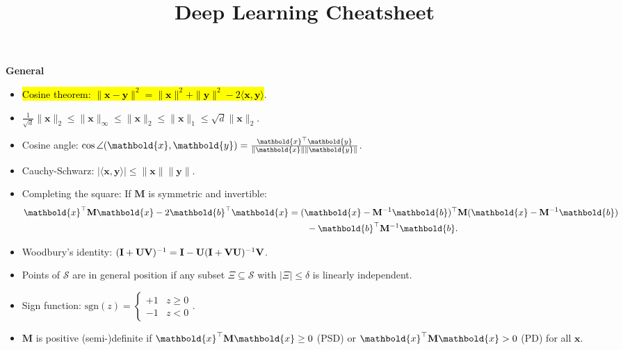 \documentclass[10pt]{article}
\title{Deep Learning Cheatsheet}
\newenvironment{subtopic}[1]
{\begin{center}\textbf{\footnotesize \sffamily #1}\end{center}}
{}
\renewcommand{\mat}[1]{\ensuremath{\mathbf{#1}}}
\renewcommand{\vec}[1]{\ensuremath{\mathbold{#1}}}
\begin{document}
\setlength{\columnsep}{0.2cm}

\begin{multicols*}{3}

    \scriptsize

    \begin{subtopic}{General}
        \begin{itemize}[left=0pt]
            \item \hl{Cosine theorem: $\| \vec{x}-\vec{y} \|^2 = \| \vec{x} \|^2 + \| \vec{y} \|^2 - 2\langle \vec{x},\vec{y} \rangle$}.
            \item $\frac{1}{\sqrt{d}} \| \vec{x} \|_2 \leq \| \vec{x} \|_{\infty} \leq \| \vec{x} \|_2 \leq \| \vec{x} \|_1 \leq \sqrt{d} \| \vec{x} \|_2$.
            \item Cosine angle: $\cos \angle{(\vec{x},\vec{y})} = \frac{\transpose{\vec{x}} \vec{y}}{\| \vec{x} \| \|
                        \vec{y} \|}$.
            \item Cauchy-Schwarz: $|\langle \vec{x}, \vec{y} \rangle| \leq \| \vec{x} \| \| \vec{y} \|$.
            \item Completing the square: If $\mat{M}$ is symmetric and invertible:
                \begin{align*}
                    \transpose{\vec{x}} \mat{M} \vec{x} - 2 \transpose{\vec{b}} \vec{x} & = \transpose{(\vec{x} - \inv{\mat{M}} \vec{b})} \mat{M} (\vec{x} - \inv{\mat{M}} \vec{b}) \\
                                                                                        & \quad \quad - \transpose{\vec{b}} \inv{\mat{M}} \vec{b}.
                \end{align*}
            \item Woodbury's identity: $\inv{(\mat{I} + \mat{U} \mat{V})} = \mat{I} - \mat{U} \inv{(\mat{I} + \mat{V} \mat{U})} \mat{V}$.
            \item Points of $\mathcal{S}$ are in general position if any subset $\Xi \subseteq \mathcal{S}$ with
                $|\Xi| \leq \delta$ is linearly independent.
            \item Sign function: $\mathrm{sgn}(z) = \begin{cases} +1 & z \geq 0 \\ -1 & z < 0 \end{cases}$.
            \item $\mat{M}$ is positive (semi-)definite if $\transpose{\vec{x}} \mat{M} \vec{x} \geq 0$ (PSD) or $\transpose{\vec{x}} \mat{M} \vec{x} > 0$ (PD) for all $\vec{x}$.

\end{itemize}
\end{subtopic}
\end{multicols*}
\end{document}

